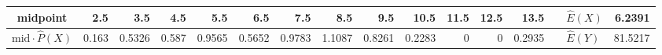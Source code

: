 \begin{table}[ht]
\begin{adjustbox}{width = \textwidth, center}
\begin{tabular}{|rr|r|r|r|r|r|r|r|r|r|r|r|r|r|r|r|}
            \multicolumn{2}{|c|}{\cellcolor[HTML]{FCE5CD}midpoint}                          & \cellcolor[HTML]{FCE5CD}2.5                    & \cellcolor[HTML]{FCE5CD}3.5                    & \cellcolor[HTML]{FCE5CD}4.5                    & \cellcolor[HTML]{FCE5CD}5.5                    & \cellcolor[HTML]{FCE5CD}6.5                    & \cellcolor[HTML]{FCE5CD}7.5                    & \cellcolor[HTML]{FCE5CD}8.5                    & \cellcolor[HTML]{FCE5CD}9.5                     & \cellcolor[HTML]{FCE5CD}10.5                    & \cellcolor[HTML]{FCE5CD}11.5                    & \cellcolor[HTML]{FCE5CD}12.5                    & \cellcolor[HTML]{FCE5CD}13.5                    & \multicolumn{1}{l|}{}                                                           & \multicolumn{1}{l|}{\cellcolor[HTML]{D9D9D9}$\widehat{E}(X)$}           & \cellcolor[HTML]{D9D9D9}6.2391                                                                   \\ \hline
            \multicolumn{2}{|c|}{\cellcolor[HTML]{FCE5CD}$\mathrm{mid}\cdot\widehat{P}(X)$} & \cellcolor[HTML]{FCE5CD}0.163                  & \cellcolor[HTML]{FCE5CD}0.5326                 & \cellcolor[HTML]{FCE5CD}0.587                  & \cellcolor[HTML]{FCE5CD}0.9565                 & \cellcolor[HTML]{FCE5CD}0.5652                 & \cellcolor[HTML]{FCE5CD}0.9783                 & \cellcolor[HTML]{FCE5CD}1.1087                 & \cellcolor[HTML]{FCE5CD}0.8261                  & \cellcolor[HTML]{FCE5CD}0.2283                  & \cellcolor[HTML]{FCE5CD}0                       & \cellcolor[HTML]{FCE5CD}0                       & \cellcolor[HTML]{FCE5CD}0.2935                  & \multicolumn{1}{l|}{}                                                           & \multicolumn{1}{l|}{\cellcolor[HTML]{D9D9D9}$\widehat{E}(Y)$}           & \cellcolor[HTML]{D9D9D9}81.5217                                                                  \\ \hline
        \end{tabular}
    \end{adjustbox}
\end{table}\\
